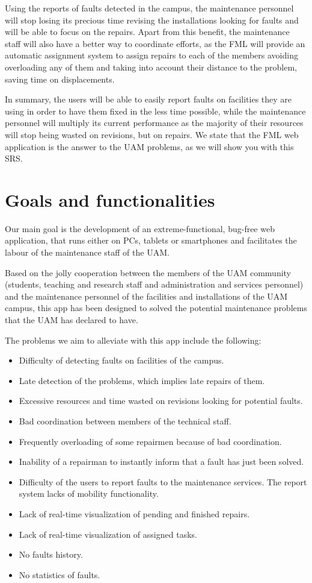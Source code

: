 \documentclass{report}
\begin{document}
Using the reports of faults detected in the campus, the maintenance personnel will stop losing its precious time revising the installations looking for faults and will be able to focus on the repairs. Apart from this benefit, the maintenance staff will also have a better way to coordinate efforts, as the FML will provide an automatic assignment system to assign repairs to each of the members avoiding overloading any of them and taking into account their distance to the problem, saving time on displacements.

In summary, the users will be able to easily report faults on facilities they are using in order to have them fixed in the less time possible, while the maintenance personnel will multiply its current performance as the majority of their resources will stop being wasted on revisions, but on repairs. We state that the FML web application is the answer to the UAM problems, as we will show you with this SRS.


\section{Goals and functionalities}


Our main goal is the development of an extreme-functional, bug-free web application, that runs either on PCs, tablets or smartphones and facilitates the labour of the maintenance staff of the UAM.

Based on the jolly cooperation between the members of the UAM community (students, teaching and research staff and administration and services personnel) and the maintenance personnel of the facilities and installations of the UAM campus, this app has been designed to solved the potential maintenance problems that the UAM has declared to have. 

The problems we aim to alleviate with this app include the following:


\begin{itemize}
\item Difficulty of detecting faults on facilities of the campus.
\item Late detection of the problems, which implies late repairs of them.
\item Excessive resources and time wasted on revisions looking for potential faults.
\item Bad coordination between members of the technical staff.
\item Frequently overloading of some repairmen because of bad coordination.
\item Inability of a repairman to instantly inform that a fault has just been solved.
\item Difficulty of the users to report faults to the maintenance services.
The report system lacks of mobility functionality.
\item Lack of real-time visualization of pending and finished repairs.
\item Lack of real-time visualization of assigned tasks.
\item No faults history.
\item No statistics of faults.
\end{itemize}
\end{document}
